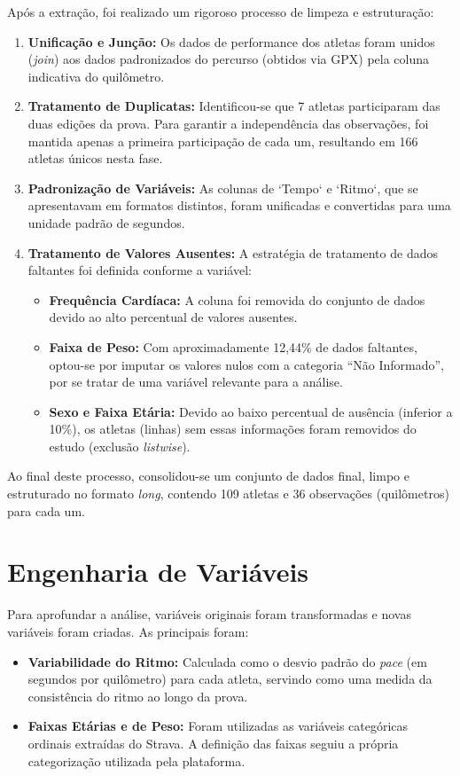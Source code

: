 Após a extração, foi realizado um rigoroso processo de limpeza e estruturação:
\begin{enumerate}
    \item \textbf{Unificação e Junção:} Os dados de performance dos atletas foram unidos (\emph{join}) aos dados padronizados do percurso (obtidos via GPX) pela coluna indicativa do quilômetro.
    
    \item \textbf{Tratamento de Duplicatas:} Identificou-se que 7 atletas participaram das duas edições da prova. Para garantir a independência das observações, foi mantida apenas a primeira participação de cada um, resultando em 166 atletas únicos nesta fase.
    
    \item \textbf{Padronização de Variáveis:} As colunas de `Tempo` e `Ritmo`, que se apresentavam em formatos distintos, foram unificadas e convertidas para uma unidade padrão de segundos.
    
    \item \textbf{Tratamento de Valores Ausentes:} A estratégia de tratamento de dados faltantes foi definida conforme a variável:
    \begin{itemize}
        \item \textbf{Frequência Cardíaca:} A coluna foi removida do conjunto de dados devido ao alto percentual de valores ausentes.
        \item \textbf{Faixa de Peso:} Com aproximadamente 12,44\% de dados faltantes, optou-se por imputar os valores nulos com a categoria ``Não Informado'', por se tratar de uma variável relevante para a análise.
        \item \textbf{Sexo e Faixa Etária:} Devido ao baixo percentual de ausência (inferior a 10\%), os atletas (linhas) sem essas informações foram removidos do estudo (exclusão \emph{listwise}).
    \end{itemize}
\end{enumerate}
Ao final deste processo, consolidou-se um conjunto de dados final, limpo e estruturado no formato \emph{long}, contendo 109 atletas e 36 observações (quilômetros) para cada um.

\section{Engenharia de Variáveis}

Para aprofundar a análise, variáveis originais foram transformadas e novas variáveis foram criadas. As principais foram:
\begin{itemize}
    \item \textbf{Variabilidade do Ritmo:} Calculada como o desvio padrão do \emph{pace} (em segundos por quilômetro) para cada atleta, servindo como uma medida da consistência do ritmo ao longo da prova.
    
    \item \textbf{Faixas Etárias e de Peso:} Foram utilizadas as variáveis categóricas ordinais extraídas do Strava. A definição das faixas seguiu a própria categorização utilizada pela plataforma.
\end{itemize}




